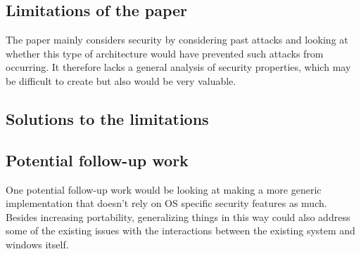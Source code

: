 \documentclass[11pt]{article}
\begin{document}
\subsection*{Limitations of the paper}

The paper mainly considers security by considering past attacks and looking at whether this type of architecture would have prevented such attacks from occurring. It therefore lacks a general analysis of security properties, which may be difficult to create but also would be very valuable.

\subsection*{Solutions to the limitations}

\subsection*{Potential follow-up work}

One potential follow-up work would be looking at making a more generic implementation that doesn't rely on OS specific security features as much. Besides increasing portability, generalizing things in this way could also address some of the existing issues with the interactions between the existing system and windows itself.
\end{document}
